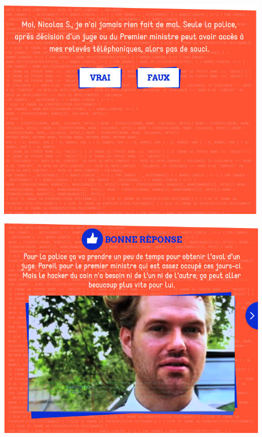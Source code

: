 \documentclass{beamer}
\begin{document}
\begin{frame}\includegraphics[scale=0.6] {./images/Quizz_HygieneNumerique_France4_26.jpg} \end{frame}
\begin{frame}\includegraphics[scale=0.6] {./images/Quizz_HygieneNumerique_France4_27.jpg} \end{frame}
\end{document}
